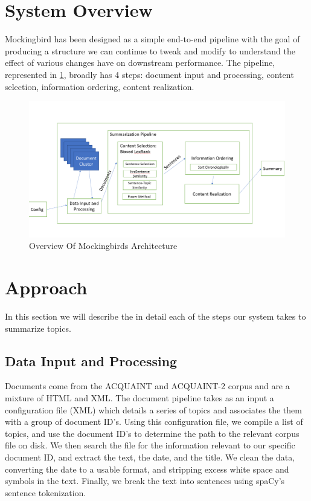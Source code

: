 \documentclass[11pt,a4paper]{article}
\begin{document}
\section{System Overview}
Mockingbird has been designed as a simple end-to-end pipeline with the goal of producing a structure we can continue to tweak and modify to understand the effect of various changes have on downstream performance. The pipeline, represented in \ref{fig:overview}, broadly has 4 steps: document input and processing, content selection, information ordering, content realization. \\
\begin{figure}[h]
  \includegraphics[width=\linewidth]{doc/overview.png}
  \caption{Overview Of Mockingbirds Architecture}
  \label{fig:overview}
\end{figure}
\section{Approach}
In this section we will describe the in detail each of the steps our system takes to summarize topics.
\subsection{Data Input and Processing}
Documents come from the ACQUAINT and ACQUAINT-2 corpus and are a mixture of HTML and XML. The document pipeline takes as an input a configuration file (XML) which details a series of topics and associates the them with a group of document ID's. Using this configuration file, we compile a list of topics, and use the document ID's to determine the path to the relevant corpus file on disk. We then search the file for the information relevant to our specific document ID, and extract the text, the date, and the title. We clean the data, converting the date to a usable format, and stripping excess white space and symbols in the text. Finally, we break the text into sentences using spaCy's sentence tokenization.
\end{document}
